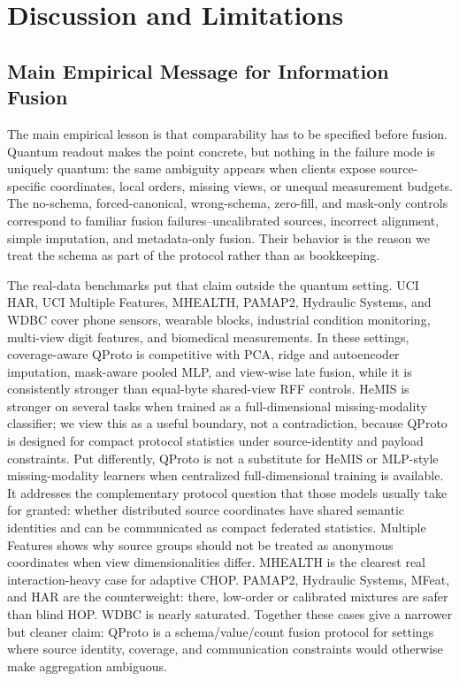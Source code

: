 \documentclass[preprint]{elsarticle}
\begin{document}
\section{Discussion and Limitations}

\subsection{Main Empirical Message for Information Fusion}

The main empirical lesson is that comparability has to be specified before fusion. Quantum readout makes the point concrete, but nothing in the failure mode is uniquely quantum: the same ambiguity appears when clients expose source-specific coordinates, local orders, missing views, or unequal measurement budgets. The no-schema, forced-canonical, wrong-schema, zero-fill, and mask-only controls correspond to familiar fusion failures--uncalibrated sources, incorrect alignment, simple imputation, and metadata-only fusion. Their behavior is the reason we treat the schema as part of the protocol rather than as bookkeeping.

The real-data benchmarks put that claim outside the quantum setting. UCI HAR, UCI Multiple Features, MHEALTH, PAMAP2, Hydraulic Systems, and WDBC cover phone sensors, wearable blocks, industrial condition monitoring, multi-view digit features, and biomedical measurements. In these settings, coverage-aware QProto is competitive with PCA, ridge and autoencoder imputation, mask-aware pooled MLP, and view-wise late fusion, while it is consistently stronger than equal-byte shared-view RFF controls. HeMIS is stronger on several tasks when trained as a full-dimensional missing-modality classifier; we view this as a useful boundary, not a contradiction, because QProto is designed for compact protocol statistics under source-identity and payload constraints. Put differently, QProto is not a substitute for HeMIS or MLP-style missing-modality learners when centralized full-dimensional training is available. It addresses the complementary protocol question that those models usually take for granted: whether distributed source coordinates have shared semantic identities and can be communicated as compact federated statistics. Multiple Features shows why source groups should not be treated as anonymous coordinates when view dimensionalities differ. MHEALTH is the clearest real interaction-heavy case for adaptive CHOP. PAMAP2, Hydraulic Systems, MFeat, and HAR are the counterweight: there, low-order or calibrated mixtures are safer than blind HOP. WDBC is nearly saturated. Together these cases give a narrower but cleaner claim: QProto is a schema/value/count fusion protocol for settings where source identity, coverage, and communication constraints would otherwise make aggregation ambiguous.
\end{document}
